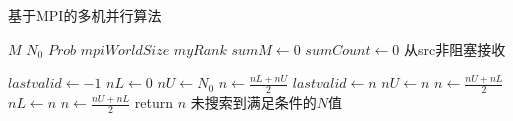 \begin{algorithm}
	\caption{基于MPI的多机并行算法}
	\label{alg:mpi}
	\begin{algorithmic}[1]
	  \Require $M$ 
          \Require $N_0$ 
          \Require $Prob$ 
          \Require $mpiWorldSize$ 
          \Require $myRank$ 
	   
           
          \State $sumM \gets 0$
          \State $sumCount \gets 0$
          \State 从src非阻塞接收
          \EndFor
          
          \EndWhile
          \EndIf



          \State $lastvalid \gets -1$ 
	  \State $nL \gets 0$  
	  \State $nU \gets N_0$ 
	  \State $n \gets \frac{nL + nU}{2}$
	   
          \State $lastvalid \gets n$
	  \State $nU \gets n$
	  \State $n \gets \frac{nU + nL}{2}$		
	  \Else  {}
	  \State $nL \gets n$
	  \State $n \gets \frac{nU + nL}{2}$
	  \EndIf
	  \EndWhile
	  \State return $n$
          \Else 
          \State $未搜索到满足条件的N值$ 
          \EndIf 
	  \EndProcedure
	\end{algorithmic}
\end{algorithm}

